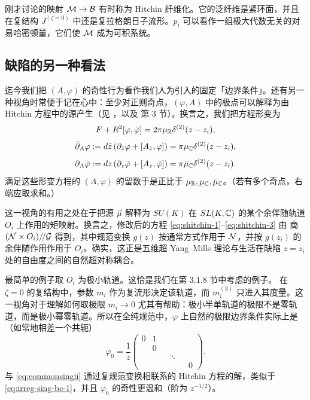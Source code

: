 刚才讨论的映射 $\mathcal{M} \to \mathcal{B}$ 有时称为 Hitchin 纤维化。它的泛纤维是紧环面，并且在复结构 $J^{(\zeta = 0)}$ 中还是复拉格朗日子流形。$p_i$ 可以看作一组极大代数无关的对易哈密顿量，它们使 $\mathcal{M}$ 成为可积系统。

\subsection{缺陷的另一种看法}\label{sec:couplings}

迄今我们把 $(A, \varphi)$ 的奇性行为看作我们人为引入的固定「边界条件」。还有另一种视角时常便于记在心中：至少对正则奇点，$(\varphi, A)$ 中的极点可以解释为由 Hitchin 方程中的源产生（见 \cite{Kapustin:1998pb}，以及 \cite{Gukov:2008sn} 第 3 节）。换言之，我们把方程形变为
\begin{equation}
F + R^2 [\varphi , \bar\varphi] =  2 \pi \mu_{\mathbb{R}} \delta^{(2)}(z-z_i), \label{eq:shitchin-1}
\end{equation}
\begin{equation}
\bar{\partial}_A \varphi := d\bar z\left( \partial_{\bar z} \varphi  + [ A_{\bar z}  ,\varphi]\right) = \pi \mu_{\mathbb{C}} \delta^{(2)}(z-z_i), \label{eq:shitchin-2}
\end{equation}
\begin{equation}
\partial_A \bar\varphi := dz\left( \partial_z \bar\varphi  + [ A_z,\bar\varphi] \right) =  \pi \bar \mu_{\mathbb{C}} \delta^{(2)}(z-z_i). \label{eq:shitchin-3}
\end{equation}
满足这些形变方程的 $(A, \varphi)$ 的留数于是正比于 $\mu_{\mathbb{R}}, \mu_{\mathbb{C}}, \bar \mu_{\mathbb{C}}$。（若有多个奇点，右端应取求和。）

这一视角的有用之处在于把源 $\vec\mu$ 解释为 $SU(K)$ 在 $SL(K,\mathbb{C})$ 的某个余伴随轨道 $O_i$ 上作用的矩映射。换言之，修改后的方程 \eqref{eq:shitchin-1}--\eqref{eq:shitchin-3} 由 \hk 商 $(\mathcal{N} \times O_i) /\!/ \mathcal{G}$ 得到，其中规范变换 $g(z)$ 按通常方式作用于 $\mathcal{N}$，并按 $g(z_i)$ 的余伴随作用作用于 $O_i$。确实，这正是五维超 Yang--Mills 理论与生活在缺陷 $z = z_i$ 处的自由度之间的自然超对称耦合。

最简单的例子取 $O_i$ 为极小轨道。这恰是我们在第 3.1.8 节中考虑的例子。%
在 $\zeta = 0$ 的复结构中，参数 $m_i$ 作为复流形决定该轨道，而 $m_i^{(3)}$ 只进入其度量。这一视角对于理解如何取极限 $m_i \to 0$ 尤其有帮助：极小半单轨道的极限不是零轨道，而是极小幂零轨道。所以在全纯规范中，$\varphi$ 上自然的极限边界条件实际上是（如常地相差一个共轭）
\begin{equation}\label{eq:commonsingii}
\varphi_0 = \frac{ 1 }{z} \begin{pmatrix} 0 & 1 & & & & \\ & 0 & &
& & \\ & & & \ddots & & \\ & & & & & 0 \end{pmatrix}.
\end{equation}
与 \eqref{eq:commonsingii} 通过复规范变换相联系的 Hitchin 方程的解，类似于 \eqref{eq:irreg-sing-bc-1}，并且 $\varphi_0$ 的奇性更温和（阶为 $z^{-1/2}$）。

